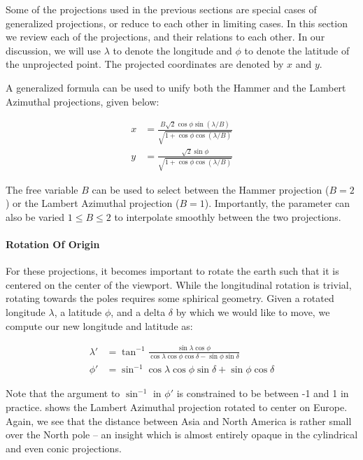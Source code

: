 Some of the projections used in the previous sections are special cases of
  generalized projections, or reduce to each other in limiting cases.
In this section we review each of the projections, and their relations to
  each other.
In our discussion, we will use $\lambda$ to denote the longitude and $\phi$
  to denote the latitude of the unprojected point.
The projected coordinates are denoted by $x$ and $y$.

A generalized formula can be used to unify both the Hammer and the Lambert
  Azimuthal projections, given below:

\def\nu{ \sqrt{1 + \cos \phi \cos (\lambda / B)} }
\begin{align}
x &= \frac{ B \sqrt{2} \cos \phi \sin (\lambda / B) } { \nu } \\
y &= \frac{ \sqrt{2} \sin \phi }{ \nu }
\end{align}

The free variable $B$ can be used to select between the Hammer projection
  ($B = 2$) or the Lambert Azimuthal projection ($B = 1$).
Importantly, the parameter can also be varied $1 \leq B \leq 2$ to interpolate
  smoothly between the two projections.

\paragraph{Rotation Of Origin}
For these projections, it becomes important to rotate the earth such that it is
  centered on the center of the viewport.
While the longitudinal rotation is trivial, rotating towards the poles requires
  some sphirical geometry.
Given a rotated longitude $\lambda$, a latitude $\phi$, and a delta $\delta$ by
  which we would like to move, we compute our new longitude and latitude as:

\def\cosdelta{ \cos \delta }
\def\sindelta{ \sin \delta }
\def\clat{ \cos \phi }
\def\x{ \cos \lambda \clat }
\def\y{ \sin \lambda \clat }
\def\z{ \sin \phi }
\def\k{ \x \sindelta + \z \cosdelta }
\begin{align}
\lambda' &= \tan^{-1} \frac{\y}{ \x \cosdelta - \z \sindelta } \\
\phi' &= \sin^{-1} \k
\end{align}

Note that the argument to $\sin^{-1}$ in $\phi'$ is constrained to be between
  -1 and 1 in practice.
 shows the Lambert Azimuthal projection rotated to center on
  Europe.
Again, we see that the distance between Asia and North America is rather small
  over the North pole -- an insight which is almost entirely opaque in the
  cylindrical and even conic projections.

